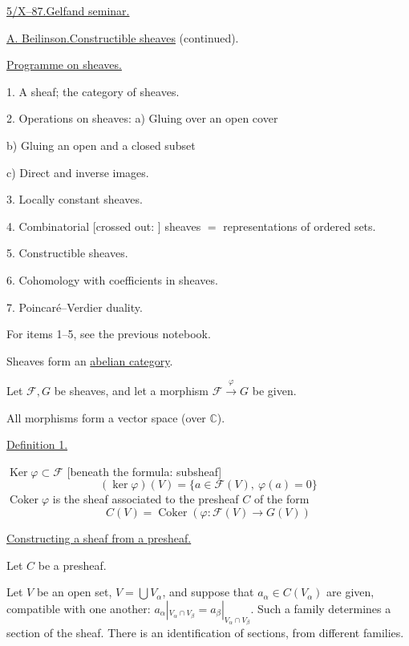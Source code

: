\underline{5/X--87.}\qquad \underline{Gelfand seminar.}

\underline{A. Beilinson.}\quad \underline{Constructible sheaves} (continued).

\underline{Programme on sheaves.}

1. A sheaf; the category of sheaves.

2. Operations on sheaves: a) Gluing over an open cover

\hspace{2em}b) Gluing an open and a closed subset

\hspace{2em}c) Direct and inverse images.

3. Locally constant sheaves.

4. Combinatorial [crossed out: ] sheaves $=$ representations of ordered sets.

5. Constructible sheaves.

6. Cohomology with coefficients in sheaves.

7. Poincar\'e--Verdier duality.

For items 1--5, see the previous notebook.

Sheaves form an \underline{abelian category}.

Let $\mathcal F,G$ be sheaves, and let a morphism
$\mathcal F\overset{\varphi}{\longrightarrow}G$ be given.

All morphisms form a vector space (over $\mathbb C$).

\underline{Definition 1.}

$\operatorname{Ker}\varphi\subset\mathcal F$ [beneath the formula: subsheaf]
\begin{equation*}
(\ker\varphi)(V)=\{a\in\mathcal F(V),\ \varphi(a)=0\}
\end{equation*}
$\operatorname{Coker}\varphi$ is the sheaf associated to the presheaf $C$ of the form
\begin{equation*}
C(V)=\operatorname{Coker}(\varphi\colon\mathcal F(V)\longrightarrow G(V))
\end{equation*}

\underline{Constructing a sheaf from a presheaf.}

Let $C$ be a presheaf.

Let $V$ be an open set, $V=\bigcup V_\alpha$, and suppose that
$a_\alpha\in C(V_\alpha)$ are given, compatible with one another:
$a_\alpha|_{V_\alpha\cap V_\beta}=a_\beta|_{V_\alpha\cap V_\beta}$.
Such a family determines a section of the sheaf. There is an identification of sections,
from different families.

